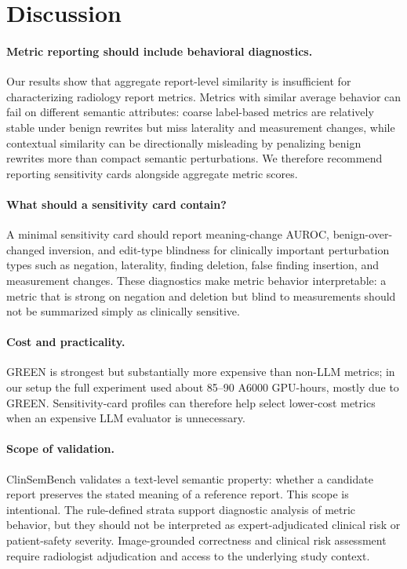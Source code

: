 \documentclass[11pt]{article}
\newcommand{\bench}{ClinSemBench\xspace}
\begin{document}
\section{Discussion}

\paragraph{Metric reporting should include behavioral diagnostics.}
Our results show that aggregate report-level similarity is insufficient for characterizing radiology report metrics. Metrics with similar average behavior can fail on different semantic attributes: coarse label-based metrics are relatively stable under benign rewrites but miss laterality and measurement changes, while contextual similarity can be directionally misleading by penalizing benign rewrites more than compact semantic perturbations. We therefore recommend reporting sensitivity cards alongside aggregate metric scores.

\paragraph{What should a sensitivity card contain?}
A minimal sensitivity card should report meaning-change AUROC, benign-over-changed inversion, and edit-type blindness for clinically important perturbation types such as negation, laterality, finding deletion, false finding insertion, and measurement changes. These diagnostics make metric behavior interpretable: a metric that is strong on negation and deletion but blind to measurements should not be summarized simply as clinically sensitive.

\paragraph{Cost and practicality.}
GREEN is strongest but substantially more expensive than non-LLM metrics; in our setup the full experiment used about 85--90 A6000 GPU-hours, mostly due to GREEN. Sensitivity-card profiles can therefore help select lower-cost metrics when an expensive LLM evaluator is unnecessary.

\paragraph{Scope of validation.}
\bench validates a text-level semantic property: whether a candidate report preserves the stated meaning of a reference report. This scope is intentional. The rule-defined strata support diagnostic analysis of metric behavior, but they should not be interpreted as expert-adjudicated clinical risk or patient-safety severity. Image-grounded correctness and clinical risk assessment require radiologist adjudication and access to the underlying study context.
\end{document}
